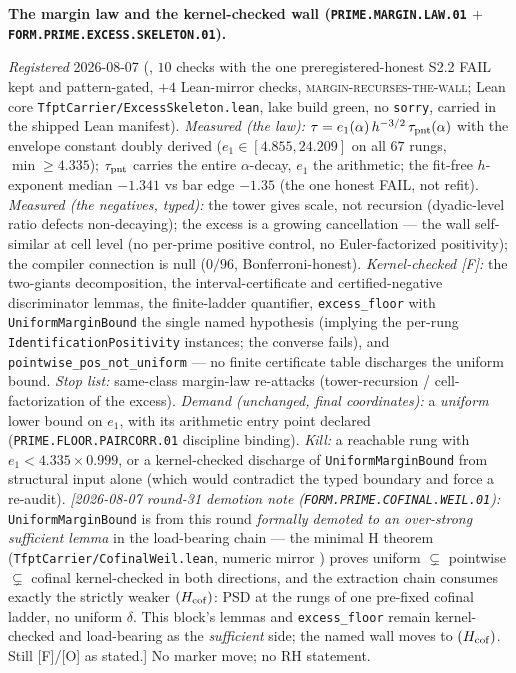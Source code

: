 \par\smallskip\noindent\textbf{The margin law and the
kernel-checked wall (\texttt{PRIME.MARGIN.LAW.01} $+$
\texttt{FORM.PRIME.\allowbreak EXCESS.\allowbreak SKELETON.01}).}
{\sloppy
\emph{Registered} 2026-08-07
(, $10$ checks with the
one preregistered-honest S2.2 FAIL kept and pattern-gated, $+4$
Lean-mirror checks, \textsc{margin-recurses-the-wall}; Lean core
\texttt{TfptCarrier/ExcessSkeleton.lean}, lake build green, no
\texttt{sorry}, carried in the shipped Lean manifest).
\emph{Measured (the law):} $\tau = e_1(\alpha)\, h^{-3/2}\,
\tau_{\rm pnt}(\alpha)$ with the envelope constant doubly
derived ($e_1 \in [4.855, 24.209]$ on all $67$ rungs,
$\min \ge 4.335$); $\tau_{\rm pnt}$ carries the entire
$\alpha$-decay, $e_1$ the arithmetic; the fit-free $h$-exponent
median $-1.341$ vs bar edge $-1.35$ (the one honest FAIL, not
refit).  \emph{Measured (the negatives, typed):} the tower gives
scale, not recursion (dyadic-level ratio defects non-decaying);
the excess is a growing cancellation --- the wall self-similar
at cell level (no per-prime positive control, no
Euler-factorized positivity); the compiler connection is null
($0/96$, Bonferroni-honest).  \emph{Kernel-checked [F]:} the
two-giants decomposition, the interval-certificate and
certified-negative discriminator lemmas, the finite-ladder
quantifier, \texttt{excess\_floor} with
\texttt{UniformMarginBound} the single named hypothesis
(implying the per-rung \texttt{IdentificationPositivity}
instances; the converse fails), and
\texttt{pointwise\_pos\_not\_uniform} --- no finite certificate
table discharges the uniform bound.  \emph{Stop list:}
same-class margin-law re-attacks (tower-recursion /
cell-factorization of the excess).  \emph{Demand (unchanged,
final coordinates):} a \emph{uniform} lower bound on $e_1$, with
its arithmetic entry point declared
(\texttt{PRIME.FLOOR.PAIRCORR.01} discipline binding).
\emph{Kill:} a reachable rung with $e_1 < 4.335 \times 0.999$,
or a kernel-checked discharge of \texttt{UniformMarginBound}
from structural input alone (which would contradict the typed
boundary and force a re-audit).
\emph{[2026-08-07 round-31 demotion note
(\texttt{FORM.PRIME.COFINAL.WEIL.01}):}
\texttt{UniformMarginBound} is from this round \emph{formally
demoted to an over-strong sufficient lemma} in the load-bearing
chain --- the minimal H theorem
(\texttt{TfptCarrier/CofinalWeil.lean}, numeric mirror
) proves uniform
$\subsetneq$ pointwise $\subsetneq$ cofinal kernel-checked in
both directions, and the extraction chain consumes exactly the
strictly weaker $(H_{\rm cof})$: PSD at the rungs of one
pre-fixed cofinal ladder, no uniform $\delta$.  This block's
lemmas and \texttt{excess\_floor} remain kernel-checked and
load-bearing as the \emph{sufficient} side; the named wall moves
to $(H_{\rm cof})$.  Still [F]/[O] as stated.]
No marker move; no RH
statement.\par}


